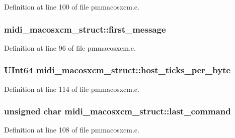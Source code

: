 Definition at line 100 of file pmmacosxcm.\+c.

\subsubsection[{\texorpdfstring{first\+\_\+message}{first_message}}]{ midi\+\_\+macosxcm\+\_\+struct\+::first\+\_\+message}\hypertarget{structmidi__macosxcm__struct_ae0cd7eb4fc4b045a42d7942430bf79a8}{}\label{structmidi__macosxcm__struct_ae0cd7eb4fc4b045a42d7942430bf79a8}


Definition at line 96 of file pmmacosxcm.\+c.

\subsubsection[{\texorpdfstring{host\+\_\+ticks\+\_\+per\+\_\+byte}{host_ticks_per_byte}}]{\setlength{\rightskip}{0pt plus 5cm}U\+Int64 midi\+\_\+macosxcm\+\_\+struct\+::host\+\_\+ticks\+\_\+per\+\_\+byte}\hypertarget{structmidi__macosxcm__struct_aaca519f457e8f6c122a53bb5a00ed969}{}\label{structmidi__macosxcm__struct_aaca519f457e8f6c122a53bb5a00ed969}


Definition at line 114 of file pmmacosxcm.\+c.

\subsubsection[{\texorpdfstring{last\+\_\+command}{last_command}}]{\setlength{\rightskip}{0pt plus 5cm}unsigned char midi\+\_\+macosxcm\+\_\+struct\+::last\+\_\+command}\hypertarget{structmidi__macosxcm__struct_a3b158048a015bcd9c381f5c2a46e56d2}{}\label{structmidi__macosxcm__struct_a3b158048a015bcd9c381f5c2a46e56d2}


Definition at line 108 of file pmmacosxcm.\+c.


